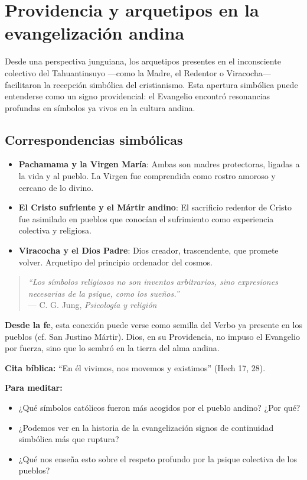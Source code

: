 \section*{Providencia y arquetipos en la evangelización andina}

Desde una perspectiva junguiana, los arquetipos presentes en el inconsciente colectivo del Tahuantinsuyo —como la Madre, el Redentor o Viracocha— facilitaron la recepción simbólica del cristianismo. Esta apertura simbólica puede entenderse como un signo providencial: el Evangelio encontró resonancias profundas en símbolos ya vivos en la cultura andina.

\subsection*{Correspondencias simbólicas}
\begin{itemize}
	\item \textbf{Pachamama y la Virgen María}: Ambas son madres protectoras, ligadas a la vida y al pueblo. La Virgen fue comprendida como rostro amoroso y cercano de lo divino.
	\item \textbf{El Cristo sufriente y el Mártir andino}: El sacrificio redentor de Cristo fue asimilado en pueblos que conocían el sufrimiento como experiencia colectiva y religiosa.
	\item \textbf{Viracocha y el Dios Padre}: Dios creador, trascendente, que promete volver. Arquetipo del principio ordenador del cosmos.
\end{itemize}

\begin{quote}
	\emph{“Los símbolos religiosos no son inventos arbitrarios, sino expresiones necesarias de la psique, como los sueños.”} \\ — C. G. Jung, \emph{Psicología y religión}
\end{quote}

\textbf{Desde la fe}, esta conexión puede verse como semilla del Verbo ya presente en los pueblos (cf. San Justino Mártir). Dios, en su Providencia, no impuso el Evangelio por fuerza, sino que lo sembró en la tierra del alma andina.

\textbf{Cita bíblica:} “En él vivimos, nos movemos y existimos” (Hech 17, 28).

\textbf{Para meditar:}
\begin{itemize}
	\item ¿Qué símbolos católicos fueron más acogidos por el pueblo andino? ¿Por qué?
	\item ¿Podemos ver en la historia de la evangelización signos de continuidad simbólica más que ruptura?
	\item ¿Qué nos enseña esto sobre el respeto profundo por la psique colectiva de los pueblos?
\end{itemize}